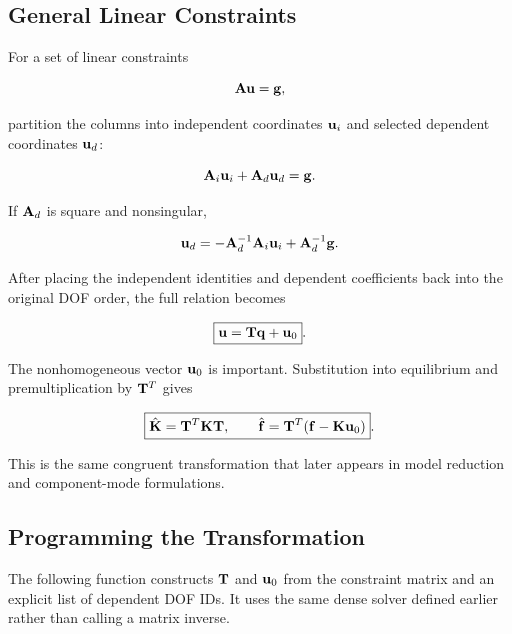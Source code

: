 \subsection{General Linear Constraints}

For a set of linear constraints

\begin{equation}
    \mathbf{A}\mathbf{u}=\mathbf{g},
\end{equation}

partition the columns into independent coordinates $\mathbf{u}_i$ and selected
dependent coordinates $\mathbf{u}_d$:

\begin{equation}
    \mathbf{A}_i\mathbf{u}_i+\mathbf{A}_d\mathbf{u}_d=\mathbf{g}.
\end{equation}

If $\mathbf{A}_d$ is square and nonsingular,

\begin{equation}\label{mfc-elimination-dependent}
    \mathbf{u}_d
    =-\mathbf{A}_d^{-1}\mathbf{A}_i\mathbf{u}_i
     +\mathbf{A}_d^{-1}\mathbf{g}.
\end{equation}

After placing the independent identities and dependent coefficients back into
the original DOF order, the full relation becomes

\begin{equation}\label{mfc-ms-gap}
    \boxed{\mathbf{u}=\mathbf{T}\mathbf{q}+\mathbf{u}_0}.
\end{equation}

The nonhomogeneous vector $\mathbf{u}_0$ is important. Substitution into equilibrium
and premultiplication by $\mathbf{T}^T$ gives

\begin{equation}\label{mfc-ms-modified-system-gap}
    \boxed{
    \hat{\mathbf{K}}=\mathbf{T}^T\mathbf{K}\mathbf{T},
    \qquad
    \hat{\mathbf{f}}=\mathbf{T}^T(\mathbf{f}-\mathbf{K}\mathbf{u}_0)
    }.
\end{equation}

This is the same congruent transformation that later appears in model reduction
and component-mode formulations.

\subsection{Programming the Transformation}

The following function constructs $\mathbf{T}$ and $\mathbf{u}_0$ from the constraint
matrix and an explicit list of dependent DOF IDs. It uses the same dense solver
defined earlier rather than calling a matrix inverse.

